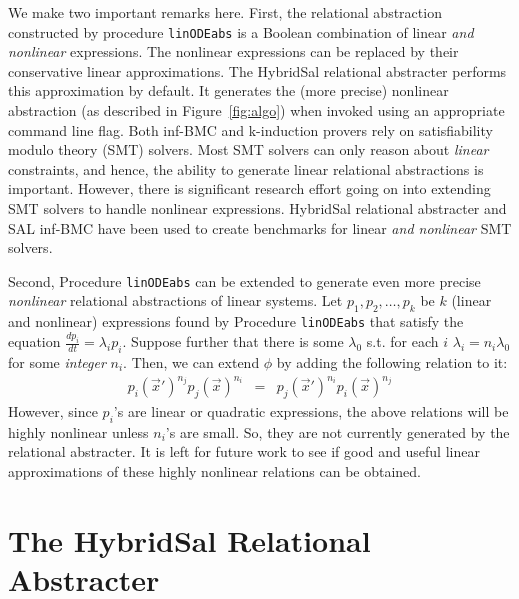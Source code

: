\documentclass{llncs}
\def\linODEabs{\tt{linODEabs}}
\newcommand\ignore[1]{{}}
\begin{document}
We make two important remarks here.
First,
the relational abstraction constructed by 
procedure {\linODEabs} is a Boolean combination
of linear {\em{and nonlinear}} expressions.
The nonlinear expressions can be replaced by their
conservative linear approximations.  The
HybridSal relational abstracter performs this approximation
by default.  It generates the (more precise)
nonlinear abstraction (as described in Figure~\ref{fig:algo})
when invoked using an appropriate command line flag.
Both inf-BMC and k-induction
provers rely on satisfiability modulo theory (SMT) solvers.
Most SMT solvers can only reason %
about {\em{linear}} constraints, and hence, the ability to
generate linear relational abstractions is important.
However, there is significant research effort going on
into extending SMT solvers to handle nonlinear expressions.
HybridSal relational abstracter and SAL inf-BMC 
have been used to create benchmarks for 
linear {\em{and nonlinear}} SMT solvers.

Second, Procedure {\linODEabs} can be extended to
generate even more precise {\em{nonlinear}}
relational abstractions of linear systems.
Let $p_1, p_2, \ldots, p_k$ be $k$ (linear and nonlinear)
expressions found by Procedure {\linODEabs} that 
satisfy the equation $\frac{dp_i}{dt} = \lambda_i p_i$.
Suppose further that 
there is some $\lambda_0$ s.t.
for each $i$
$\lambda_i = n_i \lambda_0$ for some {\em{integer}} $n_i$.
Then, we can extend $\phi$ by adding the following relation to it:
\begin{eqnarray}
 p_i(\vec{x}')^{n_j} p_j(\vec{x})^{n_i}
 & = & p_j(\vec{x}')^{n_i}  p_i(\vec{x})^{n_j}
\label{eqn:nl}
\end{eqnarray}
\ignore{
The above relationship holds for any binary reachable
pair of states $(\vec{x},\vec{x'})$ 
because
$$
 \left(\frac{p_i(\vec{x}')}{p_i(\vec{x})}\right)^{n_j} 
 = 
 \left(\frac{p_j(\vec{x}')}{p_j(\vec{x})}\right)^{n_i} 
 =
 e^{n_in_j\lambda_0 t}
$$
\endignore}
However, since $p_i$'s are linear or quadratic 
expressions, the above relations will be highly
nonlinear unless $n_i$'s are small.  So, they are
not currently generated by the relational abstracter.
It is left for future work to see if good and useful
linear approximations of these highly nonlinear relations
can be obtained.

\section{The HybridSal Relational Abstracter}
\end{document}
